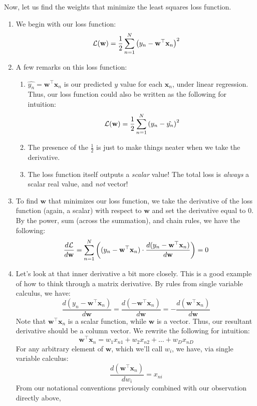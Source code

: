 \documentclass[11pt,letterpaper]{article}
\begin{document}
\noindent Now, let us find the weights that minimize the least squares loss function.
\begin{enumerate}
    \item We begin with our loss function:
    $$\mathcal{L}(\mathbf{w}) =\dfrac{1}{2}\sum_{n=1}^N\left(y_n - \mathbf{w}^\top\mathbf{x}_n \right)^2$$
    \item A few remarks on this loss function:
    \begin{enumerate}
        \item $\hat{y_n} = \mathbf{w}^\top\mathbf{x}_n$ is our predicted $y$ value for each $\mathbf{x}_n$, under linear regression. Thus, our loss function could also be written as the following for intuition:
        $$\mathcal{L}(\mathbf{w}) =\dfrac{1}{2}\sum_{n=1}^N\left(y_n - \hat{y_n} \right)^2$$
        \item The presence of the $\frac{1}{2}$ is just to make things neater when we take the derivative.
        \item The loss function itself outputs a \emph{scalar} value! The total loss is \emph{always} a scalar real value, and \emph{not} vector!
    \end{enumerate}
    \item To find $\mathbf{w}$ that minimizes our loss function, we take the derivative of the loss function (again, a scalar) with respect to $\mathbf{w}$ and set the derivative equal to $0$. By the power, sum (across the summation), and chain rules, we have the following:
    $$\frac{d\mathcal{L}}{d\mathbf{w}} = \sum_{n=1}^N \bigg((y_n - \mathbf{w}^\top\mathbf{x}_n) \cdot \frac{d(y_n - \mathbf{w}^\top\mathbf{x}_n)}{d\mathbf{w}}\bigg) = 0$$
    \item Let's look at that inner derivative a bit more closely. This is a good example of how to think through a matrix derivative. By rules from single variable calculus, we have:
    $$\frac{d(y_n - \mathbf{w}^\top\mathbf{x}_n)}{d\mathbf{w}} = \frac{d(- \mathbf{w}^\top\mathbf{x}_n)}{d\mathbf{w}} = -\frac{d(\mathbf{w}^\top\mathbf{x}_n)}{d\mathbf{w}}$$
    Note that $\mathbf{w}^\top\mathbf{x}_n$ is a scalar function, while $\mathbf{w}$ is a vector. Thus, our resultant derivative should be a column vector. We rewrite the following for intuition: $$\mathbf{w}^\top\mathbf{x}_n = w_1 x_{n1} + w_2 x_{n2} + \dots + w_D x_{nD}$$
    For any arbitrary element of $\mathbf{w}$, which we'll call $w_i$, we have, via single variable calculus:
    $$\frac{d(\mathbf{w}^\top\mathbf{x}_n)}{dw_i} = x_{ni}$$
    From our notational conventions previously combined with our observation directly above,

\end{enumerate}
\end{document}
